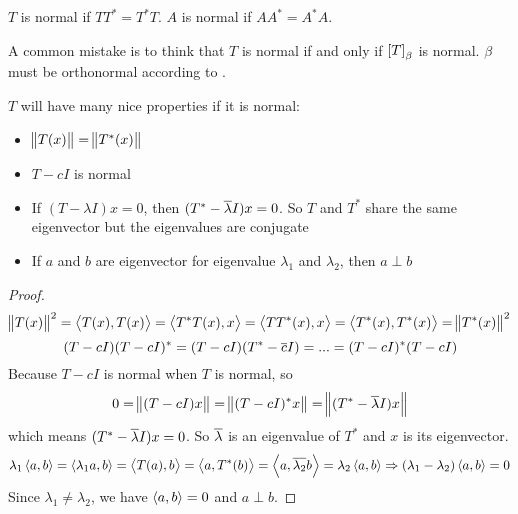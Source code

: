 \begin{definition}[Normal]
    $T$ is normal if $TT^* = T^* T$. $A$ is normal if $AA^* = A^* A$.
\end{definition}

A common mistake is to think that $T$ is normal if and only if $\coordinate{T}_\beta$ is normal. $\beta$ must be orthonormal according to .

$T$ will have many nice properties if it is normal:
\begin{itemize}
    \item $\norm{T(x)} = \norm{T^* (x)}$
    \item $T - cI$ is normal
    \item If $(T - \lambda I)x = 0$, then $(T^* - \overline{\lambda}I)x = 0$. So $T$ and $T^*$ share the same eigenvector but the eigenvalues are conjugate
    \item If $a$ and $b$ are eigenvector for eigenvalue $\lambda_1$ and $\lambda_2$, then $a \perp b$
\end{itemize}
\begin{proof}
    \begin{equation*}
        \norm{T(x)}^2 = \left\langle \displaystyle T(x), T(x) \right\rangle = \left\langle \displaystyle T^*T(x), x \right\rangle = \left\langle \displaystyle TT^*(x), x \right\rangle = \left\langle \displaystyle T^*(x), T^*(x) \right\rangle = \norm{T^*(x)}^2
    \end{equation*}
    \begin{equation*}
        (T-cI)(T-cI)^* = (T-cI)(T^* - \overline{c}I) = ... = (T-cI)^*(T-cI)
    \end{equation*}
    Because $T-cI$ is normal when $T$ is normal, so
    \begin{equation*}
        0 = \norm{(T-cI)x} = \norm{(T-cI)^* x} =  \norm{(T^*- \overline{\lambda} I)x}
    \end{equation*}
    which means $(T^*- \overline{\lambda} I)x = 0$. So $\overline{\lambda}$ is an eigenvalue of $T^*$ and $x$ is its eigenvector.
    \begin{equation*}
        \lambda_1 \left\langle \displaystyle a, b \right\rangle = \left\langle \displaystyle \lambda_1 a, b \right\rangle = \left\langle \displaystyle T(a), b \right\rangle = \left\langle \displaystyle a, T^*(b) \right\rangle = \left\langle \displaystyle a, \overline{\lambda_2}b \right\rangle = \lambda_2 \left\langle \displaystyle a, b \right\rangle \Rightarrow (\lambda_1 - \lambda_2)\left\langle \displaystyle a, b \right\rangle = 0
    \end{equation*}
    Since $\lambda_1 \neq \lambda_2$, we have $\left\langle \displaystyle a, b \right\rangle = 0$ and $a \perp b$.
\end{proof}




